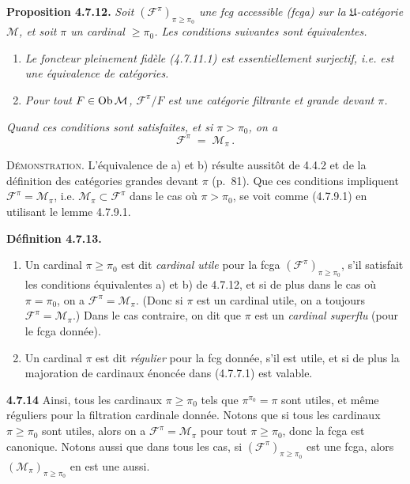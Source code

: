 \textbf{Proposition 4.7.12.} \textit{Soit $(\mathcal{F}^{\pi})_{\pi\geqslant\pi_0}$ une fcg accessible (fcga) sur la $\mathfrak{U}$-catégorie $\mathcal{M}$, et soit $\pi$ un cardinal $\geqslant\pi_0$. Les conditions suivantes sont équivalentes.}
\begin{enumerate}[label=\textit{\alph*)}]
\item \textit{Le foncteur pleinement fidèle (4.7.11.1) est essentiellement surjectif, i.e. est une équivalence de catégories.}
\item \textit{Pour tout $F\in\operatorname{Ob}\mathcal{M}$, $\mathcal{F}^{\pi}/F$ est une catégorie filtrante et grande devant $\pi$.}
\end{enumerate}

\noindent{}
\textit{Quand ces conditions sont satisfaites, et si $\pi>\pi_0$, on a}
\[
\mathcal{F}^{\pi} \;=\; \mathcal{M}_\pi \, . \tag*{(4.7.12.1)}
\]

\textsc{Démonstration}. L'équivalence de a) et b) résulte aussitôt de 4.4.2 et de la définition des catégories grandes devant $\pi$ (p.~81). Que ces
conditions impliquent $\mathcal{F}^{\pi}=\mathcal{M}_\pi$, i.e. $\mathcal{M}_\pi\subset\mathcal{F}^{\pi}$ dans le cas où $\pi>\pi_0$, se voit comme (4.7.9.1) en utilisant le lemme 4.7.9.1.

\textbf{Définition 4.7.13.}
\begin{enumerate}[label={$\arabic*^{\circ}$)}]
\item Un cardinal $\pi\geqslant\pi_0$ est dit \textit{cardinal utile} pour la fcga $(\mathcal{F}^{\pi})_{\pi\geqslant\pi_0}$, s'il satisfait les conditions équivalentes a) et b) de 4.7.12, et si de plus dans le cas où $\pi=\pi_0$, on a $\mathcal{F}^{\pi}=\mathcal{M}_\pi$. (Donc si $\pi$ est un cardinal utile, on a toujours $\mathcal{F}^{\pi}=\mathcal{M}_\pi$.) Dans le cas contraire, on dit que $\pi$ est un \textit{cardinal superflu} (pour le fcga donnée). %
\item Un cardinal $\pi$ est dit \textit{régulier} pour la fcg donnée, s'il est utile, et si de plus la majoration de cardinaux énoncée dans (4.7.7.1) est valable.
\end{enumerate}

\textbf{4.7.14} Ainsi, tous les cardinaux $\pi\geqslant\pi_0$ tels que $\pi^{\pi_0}=\pi$ sont utiles, et même réguliers pour la filtration cardinale donnée. Notons que si tous les cardinaux $\pi\geqslant\pi_0$ sont utiles, alors on a $\mathcal{F}^{\pi}=\mathcal{M}_\pi$ pour tout $\pi\geqslant\pi_0$, donc la fcga est canonique. Notons aussi que dans tous les cas, si $(\mathcal{F}^{\pi})_{\pi\geqslant\pi_0}$ est une fcga, alors $(\mathcal{M}_\pi)_{\pi\geqslant\pi_0}$ en est une aussi.

